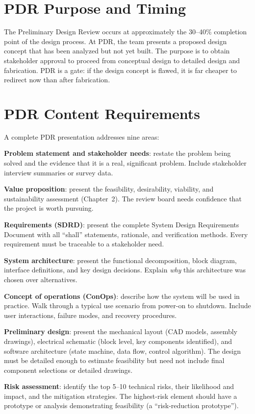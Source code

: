 \section{PDR Purpose and Timing}
The Preliminary Design Review occurs at approximately the 30--40\% completion point of the design process. At PDR, the team presents a proposed design concept that has been analyzed but not yet built. The purpose is to obtain stakeholder approval to proceed from conceptual design to detailed design and fabrication. PDR is a gate: if the design concept is flawed, it is far cheaper to redirect now than after fabrication.

\section{PDR Content Requirements}
A complete PDR presentation addresses nine areas:

\textbf{Problem statement and stakeholder needs}: restate the problem being solved and the evidence that it is a real, significant problem. Include stakeholder interview summaries or survey data.

\textbf{Value proposition}: present the feasibility, desirability, viability, and sustainability assessment (Chapter~2). The review board needs confidence that the project is worth pursuing.

\textbf{Requirements (SDRD)}: present the complete System Design Requirements Document with all ``shall'' statements, rationale, and verification methods. Every requirement must be traceable to a stakeholder need.

\textbf{System architecture}: present the functional decomposition, block diagram, interface definitions, and key design decisions. Explain \emph{why} this architecture was chosen over alternatives.

\textbf{Concept of operations (ConOps)}: describe how the system will be used in practice. Walk through a typical use scenario from power-on to shutdown. Include user interactions, failure modes, and recovery procedures.

\textbf{Preliminary design}: present the mechanical layout (CAD models, assembly drawings), electrical schematic (block level, key components identified), and software architecture (state machine, data flow, control algorithm). The design must be detailed enough to estimate feasibility but need not include final component selections or detailed drawings.

\textbf{Risk assessment}: identify the top 5--10 technical risks, their likelihood and impact, and the mitigation strategies. The highest-risk element should have a prototype or analysis demonstrating feasibility (a ``risk-reduction prototype'').


